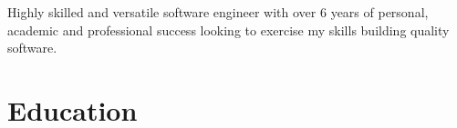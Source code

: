 \documentclass[letterpaper]{deedy-resume}
\makeatletter
\def\tikzscale{1}\begin{lrbox}{\measure@tikzpicture}%
\edef\tikzscale{\pgfmathresult}%
\makeatother
\begin{document}
\newcommand*{\xdash}[1][3em]{\rule[0.5ex]{#1}{0.55pt}}

\begin{minipage}[t]{0.30\textwidth}

    \vspace{0pt}

    \begin{minipage}{0.9\textwidth}
        \begin{center}

            \fontsize{24pt}{24pt}
            \selectfont{Josh}
            \selectfont{Rahm}

            


        \vspace{3pt}
        \begin{scaletikzpicturetowidth}{0.5\textwidth}
        \end{scaletikzpicturetowidth}

        \end{center}
    \end{minipage}
    \begin{minipage}{0.08\textwidth}
    \end{minipage}

    \vspace{10pt}
\raggedright
Highly skilled and versatile software engineer with over 6 years of personal,
academic and professional success looking to exercise my skills building quality
software.




\section{Education}


\end{minipage}
\end{document}
